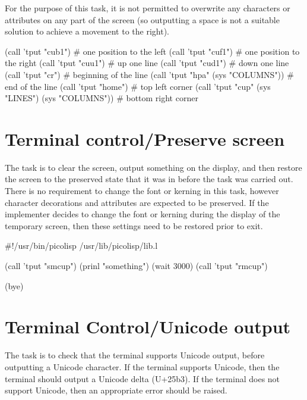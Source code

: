 For the purpose of this task, it is not permitted to overwrite any
characters or attributes on any part of the screen (so outputting a
space is not a suitable solution to achieve a movement to the right).


\begin{wideverbatim}

(call 'tput "cub1")                                # one position to the left
(call 'tput "cuf1")                                # one position to the right
(call 'tput "cuu1")                                # up one line
(call 'tput "cud1")                                # down one line
(call 'tput "cr")                                  # beginning of the line
(call 'tput "hpa" (sys "COLUMNS"))                 # end of the line
(call 'tput "home")                                # top left corner
(call 'tput "cup" (sys "LINES") (sys "COLUMNS"))   # bottom right corner

\end{wideverbatim}

\pagebreak{}
\section*{Terminal control/Preserve screen}

The task is to clear the screen, output something on the display, and
then restore the screen to the preserved state that it was in before the
task was carried out. There is no requirement to change the font or
kerning in this task, however character decorations and attributes are
expected to be preserved. If the implementer decides to change the font
or kerning during the display of the temporary screen, then these
settings need to be restored prior to exit.

\begin{wideverbatim}

#!/usr/bin/picolisp /usr/lib/picolisp/lib.l

(call 'tput "smcup")
(prinl "something")
(wait 3000)
(call 'tput "rmcup")

(bye)

\end{wideverbatim}

\pagebreak{}
\section*{Terminal Control/Unicode output}

The task is to check that the terminal supports Unicode output, before
outputting a Unicode character. If the terminal supports Unicode, then
the terminal should output a Unicode delta (U+25b3). If the terminal
does not support Unicode, then an appropriate error should be raised.

